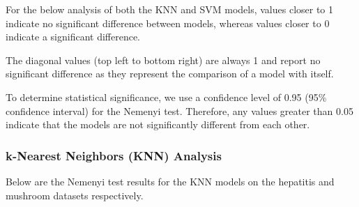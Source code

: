 For the below analysis of both the KNN and SVM models, values closer to 1 indicate no significant difference between models,
whereas values closer to 0 indicate a significant difference.

The diagonal values (top left to bottom right) are always 1 and report no significant difference
as they represent the comparison of a model with itself.

To determine statistical significance, we use a confidence level of 0.95 (95\% confidence interval) for the Nemenyi test.
Therefore, any values greater than 0.05 indicate that the models are not significantly different from each other.

\subsubsection*{k-Nearest Neighbors (KNN) Analysis}
Below are the Nemenyi test results for the KNN models on the hepatitis and mushroom datasets respectively.

